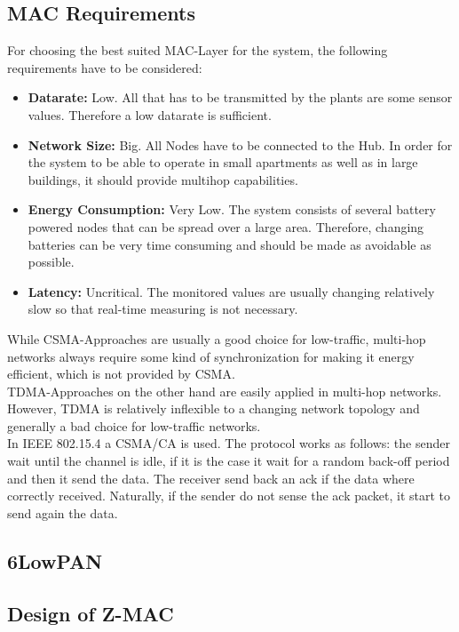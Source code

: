 \subsection{MAC Requirements}
For choosing the best suited MAC-Layer for the system, the following requirements have to be considered:

\begin{itemize}
	\item \textbf{Datarate:}
	Low. All that has to be transmitted by the plants are some sensor values. Therefore a low datarate is sufficient.
	\item \textbf{Network Size:}
	Big. All Nodes have to be connected to the Hub. In order for the system to be able to operate in small apartments as well as in large buildings, it should provide multihop capabilities.
	\item \textbf{Energy Consumption:}
	Very Low. The system consists of several battery powered nodes that can be spread over a large area. Therefore, changing batteries can be very time consuming and should be made as avoidable as possible.
	\item \textbf{Latency:}
	Uncritical. The monitored values are usually changing relatively slow so that real-time measuring is not necessary.
\end{itemize}

While CSMA-Approaches are usually a good choice for low-traffic, multi-hop networks always require some kind of synchronization for making it energy efficient, which is not provided by CSMA.\\
TDMA-Approaches on the other hand are easily applied in multi-hop networks. However, TDMA is relatively inflexible to a changing network topology and generally a bad choice for low-traffic networks.\\
In IEEE 802.15.4 a CSMA/CA is used. The protocol works as follows:
the sender wait until the channel is idle, if it is the case it wait for a random back-off period and then it send the data. The receiver send back an ack if the data where correctly received. Naturally, if the sender do not sense the ack packet, it start to send again the data.\cite{slide}\\




\subsection{6LowPAN}


\subsection{Design of Z-MAC}
